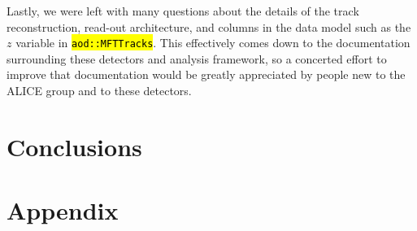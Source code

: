 \documentclass[11pt]{article}
\numberwithin{equation}{section}
\numberwithin{figure}{section}
\numberwithin{table}{section}
\let\OldTexttt\texttt
\renewcommand{\texttt}[1]{\OldTexttt{\hl{#1}}}
\begin{document}
Lastly, we were left with many questions about the details of the track reconstruction, read-out architecture, and columns in the data model such as the $z$ variable in \texttt{aod::MFTTracks}. This effectively comes down to the documentation surrounding these detectors and analysis framework, so a concerted effort to improve that documentation would be greatly appreciated by people new to the ALICE group and to these detectors. 

\section{Conclusions}



\newpage
\printbibliography

\newpage
\section*{Appendix}
\appendix

\end{document}

